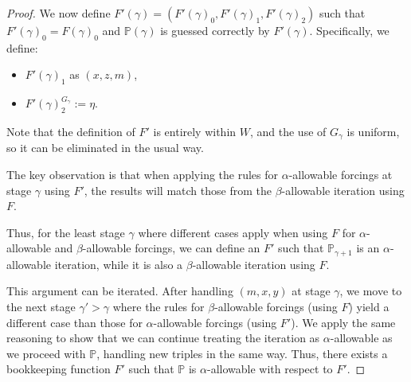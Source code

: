 \documentclass[a4paper,11pt]{article}
\newcommand{\forceP}{\mathbb{P}}
\begin{document}
\begin{proof}
We now define \( F'(\gamma) = (F'(\gamma)_0, F'(\gamma)_1, F'(\gamma)_2) \) such that \( F'(\gamma)_0 = F(\gamma)_0 \) and \( \forceP(\gamma) \) is guessed correctly by \( F'(\gamma) \). Specifically, we define:
\begin{itemize}
\item[-]  \( F'(\gamma)_1 \) as \( (x, z, m) \),
\item[-] \( F'(\gamma)_2^{G_{\gamma}} := \eta \).
\end{itemize}


Note that the definition of \( F' \) is entirely within \( W \), and the use of \( G_{\gamma} \) is uniform, so it can be eliminated in the usual way.



The key observation is that when applying the rules for \( \alpha \)-allowable forcings at stage \( \gamma \) using \( F' \), the results will match those from the \( \beta \)-allowable iteration using \( F \). 

Thus, for the least stage \( \gamma \) where different cases apply when using \( F \) for \( \alpha \)-allowable and \( \beta \)-allowable forcings, we can define an \( F' \) such that \( \forceP_{\gamma+1} \) is an \( \alpha \)-allowable iteration, while it is also a \( \beta \)-allowable iteration using \( F \). 

This argument can be iterated. After handling \( (m, x, y) \) at stage \( \gamma \), we move to the next stage \( \gamma' > \gamma \) where the rules for \( \beta \)-allowable forcings (using \( F \)) yield a different case than those for \( \alpha \)-allowable forcings (using \( F' \)). We apply the same reasoning to show that we can continue treating the iteration as \( \alpha \)-allowable as we proceed with \( \forceP \), handling new triples in the same way. Thus, there exists a bookkeeping function \( F' \) such that \( \forceP \) is \( \alpha \)-allowable with respect to \( F' \).


\end{proof}
\end{document}
